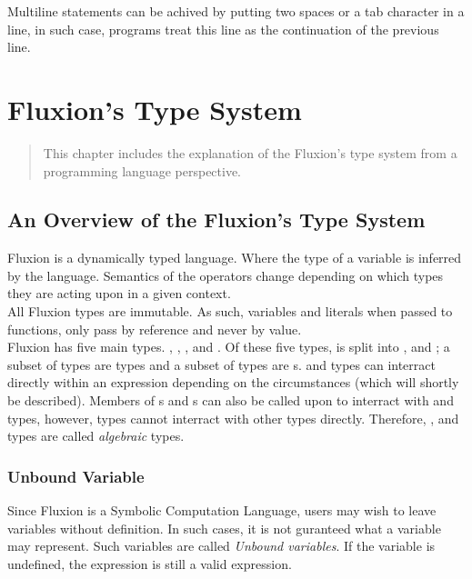 \documentclass[11pt,a4paper]{book}
\begin{document}
Multiline statements can be achived by putting two spaces or a tab character in a line, in such case, programs treat this line as the continuation of the previous line.

\chapter{Fluxion's Type System}

\vspace{1em}
\begin{quotation}
This chapter includes the explanation of the Fluxion's type system from a programming language perspective.
\end{quotation}
\newpage


\section{An Overview of the Fluxion's Type System}

Fluxion is a dynamically typed language. Where the type of a variable is inferred by the language. Semantics of the operators change depending on which types they are acting upon in a given context. \\

All Fluxion types are immutable. As such, variables and literals when passed to functions, only pass by reference and never by value.\\

Fluxion has five main types. , , ,  and . Of these five types,  is split into ,  and ; a subset of  types are  types and a subset of  types are s.   and  types can interract directly within an expression depending on the circumstances (which will shortly be described). Members of s and s can also be called upon to interract with  and  types, however,  types cannot interract with other types directly. Therefore, ,  and  types are called \textit{algebraic} types.

\subsection{Unbound Variable}

Since Fluxion is a Symbolic Computation Language, users may wish to leave variables without definition. In such cases, it is not guranteed what a variable may represent. Such variables are called \textit{Unbound variables}. If the variable  is undefined, the expression  is still a valid expression.
\end{document}
